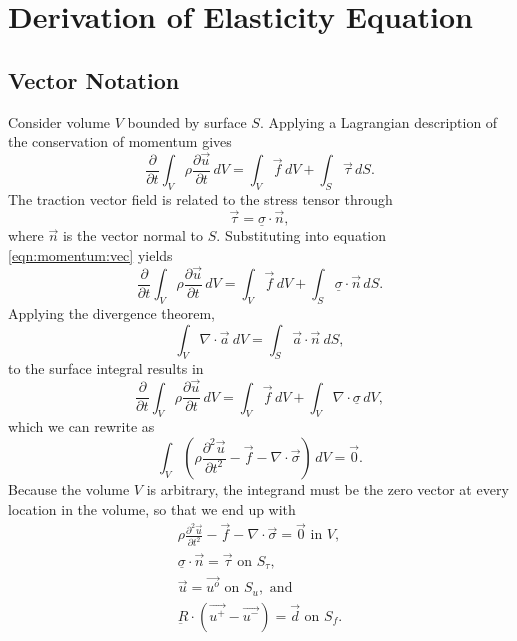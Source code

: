 \section{Derivation of Elasticity Equation}

\subsection{Vector Notation}

Consider volume $V$ bounded by surface $S$. Applying a Lagrangian
description of the conservation of momentum gives
\begin{equation}
\label{eqn:momentum:vec}
\frac{\partial}{\partial t}\int_{V}\rho\frac{\partial\vec{u}}{\partial t}\, dV=\int_{V}\vec{f}\, dV+\int_{S}\vec{\tau}\, dS.
\end{equation}
The traction vector field is related to the stress tensor through
\begin{equation}
\vec{\tau}=\underline{\sigma}\cdot\vec{n},
\end{equation}
where $\vec{n}$ is the vector normal to $S$. Substituting
into equation \vref{eqn:momentum:vec} yields
\begin{equation}
\frac{\partial}{\partial t}\int_{V}\rho\frac{\partial\vec{u}}{\partial t}\, dV=\int_{V}\vec{f}\, dV+\int_{S}\underline{\sigma}\cdot\vec{n}\, dS.
\end{equation}
Applying the divergence theorem,
\begin{equation}
\int_{V}\nabla\cdot\vec{a}\: dV=\int_{S}\vec{a}\cdot\vec{n}\: dS,
\end{equation}
to the surface integral results in
\begin{equation}
\frac{\partial}{\partial t}\int_{V}\rho\frac{\partial\vec{u}}{\partial t}\, dV=\int_{V}\vec{f}\, dV+\int_{V}\nabla\cdot\underline{\sigma}\, dV,
\end{equation}
which we can rewrite as
\begin{equation}
\int_{V}\left(\rho\frac{\partial^{2}\vec{u}}{\partial t^{2}}-\vec{f}-\nabla\cdot\vec{\sigma}\right)\, dV=\vec{0}.
\end{equation}
Because the volume $V$ is arbitrary, the integrand must be the zero
vector at every location in the volume, so that we end up with
\begin{gather}
\rho\frac{\partial^{2}\vec{u}}{\partial t^{2}}-\vec{f}-\nabla\cdot\vec{\sigma}=\vec{0}\text{ in }V,\\
\underline{\sigma}\cdot\vec{n}=\vec{\tau}\text{ on }S_{\tau}\text{,}\\
\vec{u}=\vec{u^{o}}\text{ on }S_{u},\text{ and}\\
\underbar{R}\cdot(\vec{u^{+}}-\vec{u^{-}})=\vec{d}\text{ on }S_{f}.
\end{gather}
